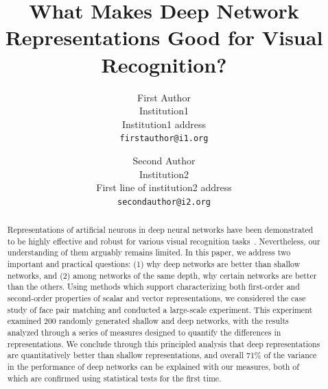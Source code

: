 \documentclass[10pt,twocolumn,letterpaper]{article}
\begin{document}
\title{What Makes Deep Network Representations Good for Visual Recognition?}

\author{First Author\\
Institution1\\
Institution1 address\\
{\tt\small firstauthor@i1.org}
\and
Second Author\\
Institution2\\
First line of institution2 address\\
{\tt\small secondauthor@i2.org}
}

\maketitle

\begin{abstract}

Representations of artificial neurons in deep neural networks have been demonstrated to be highly effective and robust for various visual recognition tasks~\cite{krizhevsky2012imagenet, sermanet2013overfeat, donahue2014decaf}.
Nevertheless, our understanding of them arguably remains limited.
In this paper, we address two important and practical questions: (1) why deep networks are better than shallow networks, and (2) among networks of the same depth, why certain networks are better than the others. Using methods which support characterizing both first-order and second-order properties of scalar and vector representations, we considered the case study of face pair matching and conducted a large-scale experiment. This experiment examined 200 randomly generated shallow and deep networks, with the results analyzed through a series of measures designed to quantify the differences in representations. 
We conclude through this principled analysis that deep representations are quantitatively better than shallow representations, and overall 71\% of the variance in the performance of deep networks can be explained with our measures, both of which are confirmed using statistical tests for the first time.


\end{abstract}
\end{document}
